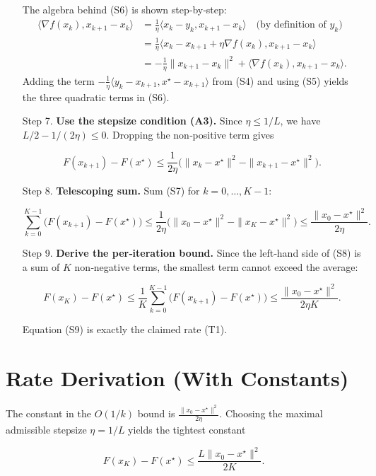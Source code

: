 \documentclass{article}
\begin{document}
\begin{enumerate}
The algebra behind (S6) is shown step‑by‑step:
\begin{align*}
\langle\nabla f(x_{k}),x_{k+1}-x_{k}\rangle
    &=\frac{1}{\eta}\langle x_{k}-y_{k},x_{k+1}-x_{k}\rangle  \quad\text{(by definition of $y_{k}$)}\\
    &=\frac{1}{\eta}\langle x_{k}-x_{k+1}+\eta\nabla f(x_{k}),x_{k+1}-x_{k}\rangle\\
    &= -\frac{1}{\eta}\|x_{k+1}-x_{k}\|^{2}
       +\langle\nabla f(x_{k}),x_{k+1}-x_{k}\rangle .
\end{align*}
Adding the term $-\frac{1}{\eta}\langle y_{k}-x_{k+1},x^{\star}-x_{k+1}\rangle$ from (S4) and using (S5) yields the three quadratic terms in (S6).

\item[Step 7.] \textbf{Use the stepsize condition (A3).}  
Since $\eta\le 1/L$, we have $L/2-1/(2\eta)\le0$. Dropping the non‑positive term gives  

\[
F(x_{k+1})-F(x^{\star})
\le \frac{1}{2\eta}\bigl(\|x_{k}-x^{\star}\|^{2}-\|x_{k+1}-x^{\star}\|^{2}\bigr).
\tag{S7}
\]

\item[Step 8.] \textbf{Telescoping sum.}  
Sum (S7) for $k=0,\dots,K-1$:

\[
\sum_{k=0}^{K-1}\bigl(F(x_{k+1})-F(x^{\star})\bigr)
\le \frac{1}{2\eta}\bigl(\|x_{0}-x^{\star}\|^{2}-\|x_{K}-x^{\star}\|^{2}\bigr)
\le \frac{\|x_{0}-x^{\star}\|^{2}}{2\eta}.
\tag{S8}
\]

\item[Step 9.] \textbf{Derive the per‑iteration bound.}  
Since the left‑hand side of (S8) is a sum of $K$ non‑negative terms, the smallest term cannot exceed the average:

\[
F(x_{K})-F(x^{\star})\le \frac{1}{K}\sum_{k=0}^{K-1}\bigl(F(x_{k+1})-F(x^{\star})\bigr)
\le \frac{\|x_{0}-x^{\star}\|^{2}}{2\eta K}.
\tag{S9}
\]

Equation (S9) is exactly the claimed rate (T1). \hfill\qedsymbol
\end{enumerate}

\section*{Rate Derivation (With Constants)}
The constant in the $O(1/k)$ bound is $\frac{\|x_{0}-x^{\star}\|^{2}}{2\eta}$.  
Choosing the maximal admissible stepsize $\eta=1/L$ yields the tightest constant  

\[
F(x_{K})-F(x^{\star})\le \frac{L\|x_{0}-x^{\star}\|^{2}}{2K}.
\]
\end{document}

